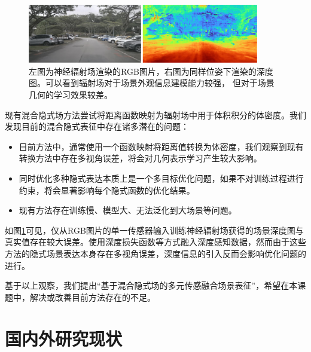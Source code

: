 \begin{figure}[t]
    \centering
    \includegraphics[width=0.9\textwidth]{undergraduate-thesis/images/RGB-D.pdf}
    \caption{左图为神经辐射场渲染的RGB图片，右图为同样位姿下渲染的深度图。可以看到辐射场对于场景外观信息建模能力较强， 但对于场景几何的学习效果较差。}
    \label{fig:rgb-d}
\end{figure}

现有混合隐式场方法尝试将距离函数映射为辐射场中用于体积积分的体密度\cite{wang_neus_2021, azinovic_neural_2022}。我们发现目前的混合隐式表征中存在诸多潜在的问题：
\begin{itemize}
    \item 目前方法中，通常使用一个函数映射将距离值转换为体密度，我们观察到现有转换方法中存在多视角误差，将会对几何表示学习产生较大影响。
    \item 同时优化多种隐式表达本质上是一个多目标优化问题，如果不对训练过程进行约束，将会显著影响每个隐式函数的优化结果。
    \item 现有方法存在训练慢、模型大、无法泛化到大场景等问题。
\end{itemize}

如图\ref{fig:rgb-d}可见，仅从RGB图片的单一传感器输入训练神经辐射场获得的场景深度图与真实值存在较大误差。使用深度损失函数等方式融入深度感知数据，然而由于这些方法的隐式场景表达本身存在多视角误差，深度信息的引入反而会影响优化问题的进行。

基于以上观察，我们提出“基于混合隐式场的多元传感融合场景表征”，希望在本课题中，解决或改善目前方法存在的不足。

\section{国内外研究现状}

